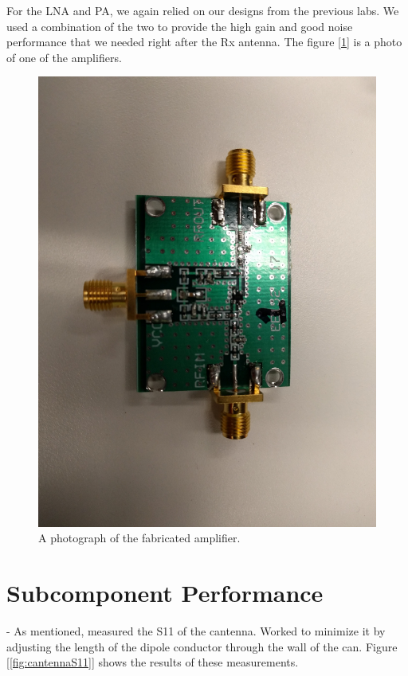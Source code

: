 \documentclass[reprint, aps, prl]{revtex4-1}
\begin{document}
For the LNA and PA, we again relied on our designs from the previous labs. We used a combination of the two to provide the high gain and good noise performance that we needed right after the Rx antenna. The figure [\ref{fig:amplifier}] is a photo of one of the amplifiers.
\begin{figure}[!htbp]
    \centering
    \includegraphics[scale=0.05]{Photos/amplifier.jpg}
    \caption{A photograph of the fabricated amplifier.}
    \label{fig:amplifier}
\end{figure}


\section*{Subcomponent Performance}

- As mentioned, measured the S11 of the cantenna. Worked to minimize it by adjusting the length of the dipole conductor through the wall of the can. Figure [\ref{fig:cantennaS11}] shows the results of these measurements.
\end{document}
